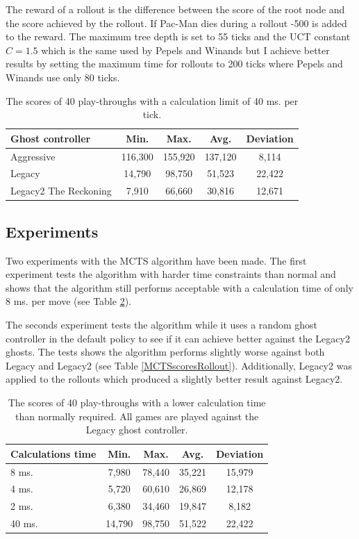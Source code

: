\documentclass[conference]{IEEEtran}
\begin{document}
The reward of a rollout is the difference between the score of the root node and the score achieved by the rollout. If Pac-Man dies during a rollout -500 is added to the reward. The maximum tree depth is set to 55 ticks and the UCT constant $C=1.5$ which is the same used by Pepels and Winands but I achieve better results by setting the maximum time for rollouts to 200 ticks where Pepels and Winands use only 80 ticks. 

\begin{table}
\begin{center}
\caption{The scores of 40 play-throughs 
with a calculation limit of 40 ms. per tick. }
\label{MCTSscores}
\begin{tabular}{|l|c|c|c|c|}
\hline
Ghost controller & Min. & Max. & Avg. & Deviation \\
\hline
Aggressive & 116,300 & 155,920 & 137,120 & 8,114 \\
\hline
Legacy & 14,790 & 98,750 & 51,523 & 22,422 \\
\hline
Legacy2 The Reckoning & 7,910 & 66,660 & 30,816 & 12,671 \\
\hline
\end{tabular}
\end{center}
\end{table}

\subsection{Experiments}
Two experiments with the MCTS algorithm have been made. The first experiment tests the algorithm with harder time constraints than normal and shows that the algorithm still performs acceptable with a calculation time of only 8 ms. per move (see Table \ref{MCTSscorestime}). 

The seconds experiment tests the algorithm while it uses a random ghost controller in the default policy to see if it can achieve better against the Legacy2 ghosts. The tests shows the algorithm performs slightly worse against both Legacy and Legacy2 (see Table \ref{MCTSscoresRollout}). Additionally, Legacy2 was applied to the rollouts which produced a slightly better result against Legacy2.

\begin{table}
\begin{center}
\caption{The scores of 40 play-throughs with a lower calculation time than normally required. All games are played against the Legacy ghost controller. }
\label{MCTSscorestime}
\begin{tabular}{|l|c|c|c|c|}
\hline
Calculations time & Min. & Max. & Avg. & Deviation \\
\hline
8 ms. & 7,980 & 78,440 & 35,221 & 15,979\\
\hline
4 ms. & 5,720 & 60,610 & 26,869 & 12,178 \\
\hline
2 ms. & 6,380 & 34,460 & 19,847 & 8,182 \\
\hline
\hline
40 ms. & 14,790 & 98,750 & 51,522 & 22,422 \\
\hline
\end{tabular}
\end{center}
\end{table}
\end{document}
